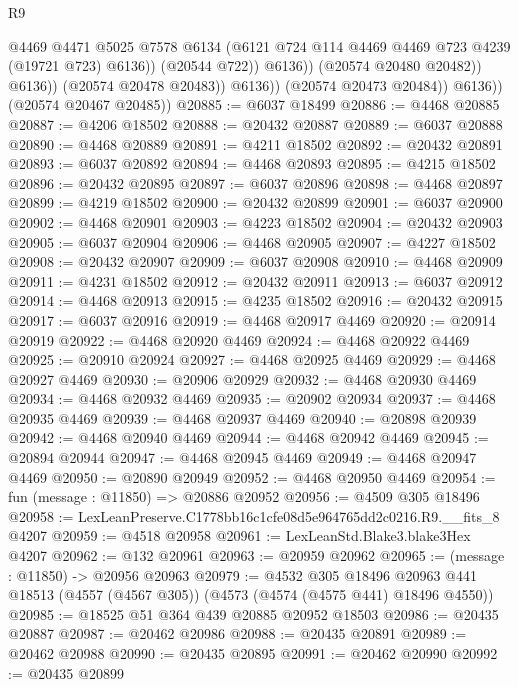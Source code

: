 \begin{lexlean}{R9}
\begin{coremodule}
                                @4469
                                @4471
                                @5025
                                @7578
                                @6134
                                (@6121 @724 @114 @4469 @4469 @723 @4239 (@19721 @723) @6136))
                              (@20544 @722))
                            @6136))
                        (@20574 @20480 @20482))
                      @6136))
                  (@20574 @20478 @20483))
                @6136))
            (@20574 @20473 @20484))
          @6136))
      (@20574 @20467 @20485))
@20885 := @6037 @18499
@20886 := @4468 @20885
@20887 := @4206 @18502
@20888 := @20432 @20887
@20889 := @6037 @20888
@20890 := @4468 @20889
@20891 := @4211 @18502
@20892 := @20432 @20891
@20893 := @6037 @20892
@20894 := @4468 @20893
@20895 := @4215 @18502
@20896 := @20432 @20895
@20897 := @6037 @20896
@20898 := @4468 @20897
@20899 := @4219 @18502
@20900 := @20432 @20899
@20901 := @6037 @20900
@20902 := @4468 @20901
@20903 := @4223 @18502
@20904 := @20432 @20903
@20905 := @6037 @20904
@20906 := @4468 @20905
@20907 := @4227 @18502
@20908 := @20432 @20907
@20909 := @6037 @20908
@20910 := @4468 @20909
@20911 := @4231 @18502
@20912 := @20432 @20911
@20913 := @6037 @20912
@20914 := @4468 @20913
@20915 := @4235 @18502
@20916 := @20432 @20915
@20917 := @6037 @20916
@20919 := @4468 @20917 @4469
@20920 := @20914 @20919
@20922 := @4468 @20920 @4469
@20924 := @4468 @20922 @4469
@20925 := @20910 @20924
@20927 := @4468 @20925 @4469
@20929 := @4468 @20927 @4469
@20930 := @20906 @20929
@20932 := @4468 @20930 @4469
@20934 := @4468 @20932 @4469
@20935 := @20902 @20934
@20937 := @4468 @20935 @4469
@20939 := @4468 @20937 @4469
@20940 := @20898 @20939
@20942 := @4468 @20940 @4469
@20944 := @4468 @20942 @4469
@20945 := @20894 @20944
@20947 := @4468 @20945 @4469
@20949 := @4468 @20947 @4469
@20950 := @20890 @20949
@20952 := @4468 @20950 @4469
@20954 := fun (message : @11850) => @20886 @20952
@20956 := @4509 @305 @18496
@20958 := LexLeanPreserve.C1778bb16c1cfe08d5e964765dd2c0216.R9.__fits_8 @4207
@20959 := @4518 @20958
@20961 := LexLeanStd.Blake3.blake3Hex @4207
@20962 := @132 @20961
@20963 := @20959 @20962
@20965 := (message : @11850) -> @20956 @20963
@20979 := @4532
    @305
    @18496
    @20963
    @441
    @18513
    (@4557 (@4567 @305))
    (@4573 (@4574 (@4575 @441) @18496 @4550))
@20985 := @18525 @51 @364 @439 @20885 @20952 @18503
@20986 := @20435 @20887
@20987 := @20462 @20986
@20988 := @20435 @20891
@20989 := @20462 @20988
@20990 := @20435 @20895
@20991 := @20462 @20990
@20992 := @20435 @20899

\end{coremodule}
\end{lexlean}
